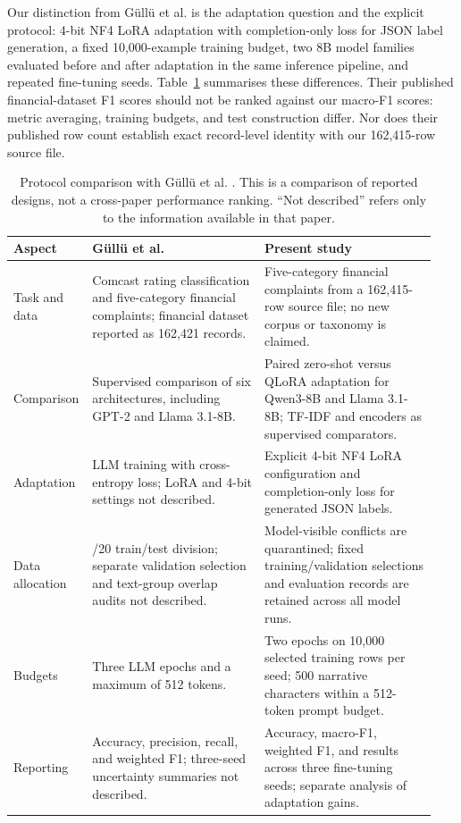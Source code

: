 \documentclass{elektr}
\renewcommand{\arraystretch}{0.94}
\begin{document}
Our distinction from G\"ull\"u et al. is the adaptation question and the explicit protocol: 4-bit NF4 LoRA adaptation with completion-only loss for JSON label generation, a fixed 10,000-example training budget, two 8B model families evaluated before and after adaptation in the same inference pipeline, and repeated fine-tuning seeds. Table~\ref{tab:gullu-positioning} summarises these differences. Their published financial-dataset F1 scores should not be ranked against our macro-F1 scores: metric averaging, training budgets, and test construction differ. Nor does their published row count establish exact record-level identity with our 162,415-row source file.

\begin{table}[htbp]
\caption{Protocol comparison with G\"ull\"u et al. \cite{gullu2025complaintllm}. This is a comparison of reported designs, not a cross-paper performance ranking. ``Not described'' refers only to the information available in that paper.}
\label{tab:gullu-positioning}
\begin{center}
\small
\setlength{\tabcolsep}{4pt}
\renewcommand{\arraystretch}{1.12}
\begin{tabular}{@{}>{\raggedright\arraybackslash}p{0.14\linewidth}>{\raggedright\arraybackslash}p{0.40\linewidth}>{\raggedright\arraybackslash}p{0.40\linewidth}@{}}
\hline
\textbf{Aspect} & \textbf{G\"ull\"u et al.} & \textbf{Present study}\\
\hline
Task and data & Comcast rating classification and five-category financial complaints; financial dataset reported as 162,421 records. & Five-category financial complaints from a 162,415-row source file; no new corpus or taxonomy is claimed.\\
Comparison & Supervised comparison of six architectures, including GPT-2 and Llama 3.1-8B. & Paired zero-shot versus QLoRA adaptation for Qwen3-8B and Llama 3.1-8B; TF-IDF and encoders as supervised comparators.\\
Adaptation & LLM training with cross-entropy loss; LoRA and 4-bit settings not described. & Explicit 4-bit NF4 LoRA configuration and completion-only loss for generated JSON labels.\\
Data allocation & 80/20 train/test division; separate validation selection and text-group overlap audits not described. & Model-visible conflicts are quarantined; fixed training/validation selections and evaluation records are retained across all model runs.\\
Budgets & Three LLM epochs and a maximum of 512 tokens. & Two epochs on 10,000 selected training rows per seed; 500 narrative characters within a 512-token prompt budget.\\
Reporting & Accuracy, precision, recall, and weighted F1; three-seed uncertainty summaries not described. & Accuracy, macro-F1, weighted F1, and results across three fine-tuning seeds; separate analysis of adaptation gains.\\
\hline
\end{tabular}
\end{center}
\end{table}
\end{document}
